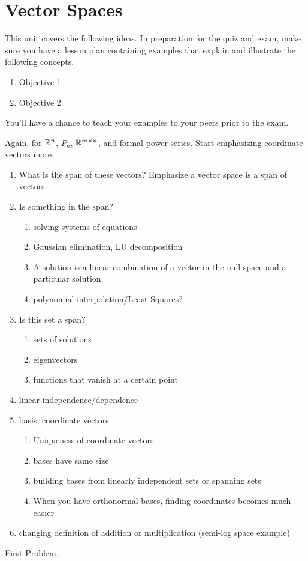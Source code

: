 \chapter{Vector Spaces}
This unit covers the following ideas. In preparation for the quiz and
exam, make sure you have a lesson plan containing examples that
explain and illustrate the following concepts.  
\begin{enumerate}
\item Objective 1
\item Objective 2
\end{enumerate}
You'll have a chance to teach your examples to your peers prior to the exam.


Again, for $\mathbb{R}^n$, $P_n$, $\mathbb{R}^{m\times n}$, and formal power
series. Start emphasizing coordinate vectors more.
\begin{enumerate}
\item What is the span of these vectors?  Emphasize a vector space is
  a span of vectors.

\item Is something in the span?
  \begin{enumerate}
  \item solving systems of equations
  \item Gaussian elimination, LU decomposition
  \item A solution is a linear combination of a vector in the null
    space and a particular solution
  \item polynomial interpolation/Least Squares?
  \end{enumerate}

\item Is this set a span?
  \begin{enumerate}
  \item sets of solutions
  \item eigenvectors
  \item functions that vanish at a certain point
  \end{enumerate}

\item linear independence/dependence

\item basis, coordinate vectors
  \begin{enumerate}
  \item Uniqueness of coordinate vectors
  \item bases have same size
  \item building bases from linearly independent sets or spanning sets
  \item When you have orthonormal bases, finding coordinates becomes
    much easier
  \end{enumerate}

\item changing definition of addition or multiplication (semi-log
  space example)
\end{enumerate}

\begin{problem}
  First Problem.
\end{problem}



